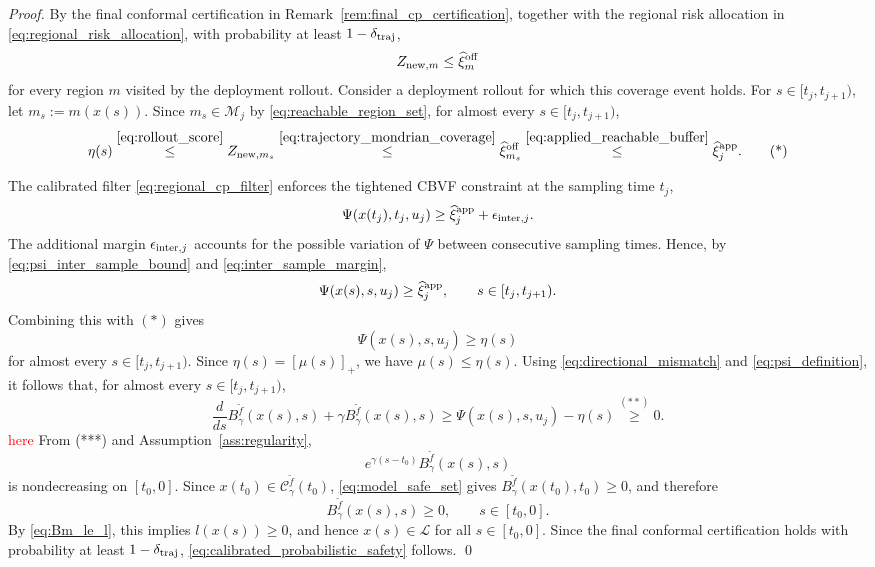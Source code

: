 \documentclass[letterpaper,10pt,conference]{ieeeconf}
\newcommand{\Bm}{B_{\gamma}^{\tilde f}}
\newcommand{\safe}{\mathcal{L}}
\newcommand{\xv}{x}
\begin{document}
\begin{proof}
By the final conformal certification in
Remark~\ref{rem:final_cp_certification}, together with the regional risk
allocation in \eqref{eq:regional_risk_allocation}, with probability at least
$1-\delta_{\rm traj}$,
\[
Z_{{\rm new},m}
\leq
\widehat\xi^{\rm off}_{m}
\]
for every region $m$ visited by the deployment rollout.
Consider a deployment rollout for which this coverage event holds. For
$s\in[t_j,t_{j+1})$, let $m_s:=m(\xv(s))$. Since
$m_s\in\mathcal M_j$ by \eqref{eq:reachable_region_set}, for almost every
$s\in[t_j,t_{j+1})$,
\[
\eta(s)
\overset{\eqref{eq:rollout_score}}{\leq}
Z_{{\rm new},m_s}
\overset{\eqref{eq:trajectory_mondrian_coverage}}{\leq}
\widehat\xi^{\rm off}_{m_s}
\overset{\eqref{eq:applied_reachable_buffer}}{\leq}
\widehat\xi^{\rm app}_{j}.
\tag{*}
\]

The calibrated filter \eqref{eq:regional_cp_filter} enforces the tightened
CBVF constraint at the sampling time $t_j$,
\[
\Psi(\xv(t_j),t_j,u_j)
\geq
\widehat\xi^{\rm app}_{j}
+
\epsilon_{{\rm inter},j}.
\]
The additional margin $\epsilon_{{\rm inter},j}$ accounts for the possible
variation of $\Psi$ between consecutive sampling times. Hence, by
\eqref{eq:psi_inter_sample_bound} and \eqref{eq:inter_sample_margin},
\[
\Psi(\xv(s),s,u_j)
\geq
\widehat\xi^{\rm app}_{j},
\qquad
s\in[t_j,t_{j+1}).
\]
Combining this with $(*)$ gives
\[
\Psi(\xv(s),s,u_j)\geq\eta(s)
\tag{**}
\]
for almost every $s\in[t_j,t_{j+1})$.
Since $\eta(s)=[\mu(s)]_+$, we have $\mu(s)\leq\eta(s)$. Using
\eqref{eq:directional_mismatch} and \eqref{eq:psi_definition}, it follows
that, for almost every $s\in[t_j,t_{j+1})$,
\[
\frac{d}{ds}\Bm(\xv(s),s)
+\gamma\Bm(\xv(s),s)
\geq
\Psi(\xv(s),s,u_j)-\eta(s)
\overset{(**)}{\geq}0.
\tag{***}
\]
\textcolor{red}{here}
From (***) and
Assumption~\ref{ass:regularity},
\[
e^{\gamma(s-t_0)}\Bm(\xv(s),s)
\]
is nondecreasing on $[t_0,0]$. Since
$\xv(t_0)\in\mathcal C_{\gamma}^{\tilde f}(t_0)$,
\eqref{eq:model_safe_set} gives
$\Bm(\xv(t_0),t_0)\geq0$, and therefore
\[
\Bm(\xv(s),s)\geq0,
\qquad
s\in[t_0,0].
\]
By \eqref{eq:Bm_le_l}, this implies
$l(\xv(s))\geq0$, and hence
$\xv(s)\in\safe$ for all $s\in[t_0,0]$.
Since the final conformal certification holds with probability at least
$1-\delta_{\rm traj}$, \eqref{eq:calibrated_probabilistic_safety} follows.
\hfill\qed
\end{proof}
\end{document}
